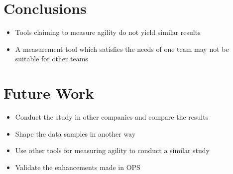\section{Conclusions}

\begin{itemize}
	\item Tools claiming to measure agility do not yield similar results
	\item A measurement tool which satisfies the needs of one team may not be suitable for other teams  
\end{itemize}


\clearpage

\section{Future Work}

\begin{itemize}
	\item Conduct the study in other companies and compare the results
	\item Shape the data samples in another way
	\item Use other tools for measuring agility to conduct a similar study
	\item Validate the enhancements made in OPS
\end{itemize}

\clearpage
